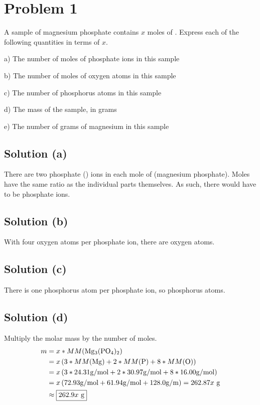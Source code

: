 \documentclass{article}
\begin{document}
    \section{Problem 1}
        A sample of magnesium phosphate contains $x$ moles of .
        Express each of the following quantities in terms of $x$.

        a) The number of moles of phosphate ions in this sample
        
        b) The number of moles of oxygen atoms in this sample

        c) The number of phosphorus atoms in this sample

        d) The mass of the sample, in grams

        e) The number of grams of magnesium in this sample

        \subsection{Solution (a)}
            There are two phosphate () ions in each mole of  (magnesium phosphate). 
            Moles have the same ratio as the individual parts themselves. 
            As such, there would have to be  phosphate ions.

        \subsection{Solution (b)}
            With four oxygen atoms per phosphate ion, there are  oxygen atoms.

        \subsection{Solution (c)}
            There is one phosphorus atom per phosphate ion, so  phosphorus atoms.

        \subsection{Solution (d)}
            Multiply the molar mass by the number of moles.
            \begin{align}
                m   &=  x * MM(\ce{Mg3(PO4)2})\\
                    &=  x \left( 3*MM(\ce{Mg}) + 2 * MM(\ce{P}) + 8 * MM(\ce{O}) \right)\\
                    &=  x \left( 3 * 24.31 \unit{\gram/\mol} + 2 * 30.97 \unit{\gram/\mol} + 8 * 16.00 \unit{\gram/\mol} \right)\\
                    &=  x \left( 72.93 \unit{\gram/\mol} + 61.94 \unit{\gram/mol} + 128.0 \unit{\gram/\meter} \right)
                    =   262.87x\ \unit{\gram}\\
                    &\approx    \boxed{262.9x\ \unit{\gram}}
            \end{align}
\end{document}
